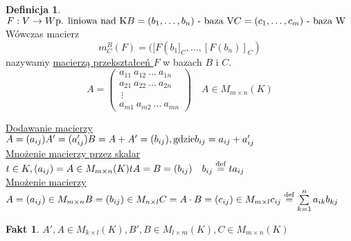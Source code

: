 \documentclass[12pt,a4paper]{article}
\theoremstyle{plain}
\theoremstyle{definition}
\newtheorem{ft}{Fakt}[section]
\theoremstyle{definition}
\newtheorem{df}{Definicja}[section]
\theoremstyle{definition}
\theoremstyle{definition}
\theoremstyle{definition}
\theoremstyle{definition}
\theoremstyle{definition}
\theoremstyle{definition}
\theoremstyle{definition}
\begin{document}
\begin{df} 
    $ 
        F: V \rightarrow W \text{p. liniowa nad K} \\
        B = (b_1,\dots,b_n) \text{ - baza V} \\
        C = (c_1, \dots,c_m) \text{ - baza W} \\
    $
    Wówczas macierz \\
        $$m^B_C (F) = ([F(b_1]_C,\dots,[F(b_n)]_C)$$ nazywamy \underline{macierzą przekształceń $F$} w bazach $B$ i $C$. 
    $$ A = \begin{pmatrix} a_{11} \ a_{12} \ \dots \ a_{1n} \\
                           a_{21} \ a_{22} \ \dots \ a_{2n} \\
                                   \        \vdots \  \\
                           a_{m1} \ a_{m2} \ \dots \ a_{mn}
    \end{pmatrix} \quad A \in M_{m \times n} (K)$$
\end{df}
\noindent 
\underline{Dodawanie macierzy} \\
$ 
  A = (a_{ij}) \\
  A' =(a'_{ij}) \\ 
  B = A + A' = (b_{ij}), \text{gdzie} b_{ij} = a_{ij} + a'_{ij}
$ \\
\underline{Mnożenie macierzy przez skalar} \\ 
$ 
    t \in K, (a_{ij}) = A \in M_{m \times n}(K) \\
    tA = B = (b_{ij}) \quad b_{ij} \overset{\mathrm{def}}{=} t a_{ij}
$ \\
\underline{Mnożenie macierzy} \\ 
$
    A = (a_{ij}) \in M_{m \times n} \\
    B = (b_{ij}) \in M_{n \times l} \\ 
    C = A \cdot B = (c_{ij}) \in M_{m \times l} \\
    c_{ij} \overset{\mathrm{def}}{=} \sum\limits_{k=1}^n a_{ik}b_{kj}
$
\begin{ft}
    $A', A \in M_{k \times l} (K), B', B \in M_{l \times m} (K), C \in M_{m \times n} (K)$
\end{ft}
\end{document}
